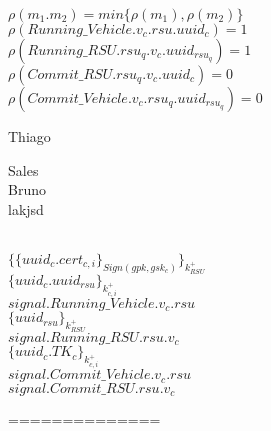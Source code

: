 \documentclass[]{article}
\begin{document}
$\rho(m_1.m_2) = min\{\rho(m_1), \rho(m_2)\}$
\\

$\rho(Running\_Vehicle.v_c.rsu.uuid_c) = 1$
\\

$\rho(Running\_RSU.rsu_q.v_c.uuid_{rsu_q}) = 1$
\\

$\rho(Commit\_RSU.rsu_q.v_c.uuid_{c}) = 0$
\\

$\rho(Commit\_Vehicle.v_c.rsu_q.uuid_{rsu_q}) = 0$


Thiago \parbox[t]{.6\textwidth}{Sales \\ Bruno \\ lakjsd}\\


$\{ \{uuid_c.cert_{c,i} \}_{Sign(gpk, gsk_{c})}\}_{k^{+}_{RSU}}$
\\

$ \{uuid_c.uuid_{rsu} \}_{k^{+}_{c, i}}$
\\

$signal.Running\_Vehicle.v_{c}.rsu$
\\

$ \{uuid_{rsu} \}_{k^{+}_{RSU}}$
\\

$signal.Running\_RSU.rsu.v_c$
\\

$ \{uuid_c.TK_c \}_{k^{+}_{c, i}}$
\\

$signal.Commit\_Vehicle.v_c.rsu$
\\

$signal.Commit\_RSU.rsu.v_c$

==============
\\

%
\end{document}
